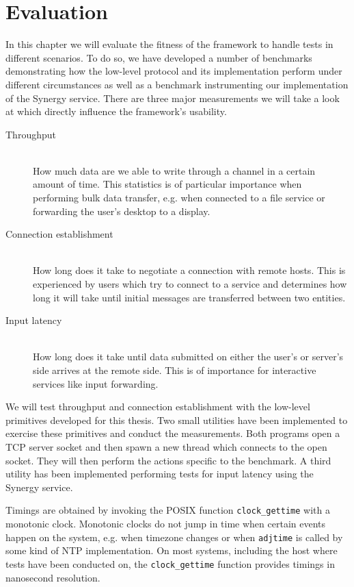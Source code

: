 \chapter{Evaluation}
\label{sec:evaluation}

In this chapter we will evaluate the fitness of the framework to handle tests in different scenarios.
To do so, we have developed a number of benchmarks demonstrating how the low-level protocol and its implementation perform under different circumstances as well as a benchmark instrumenting our implementation of the Synergy service.
There are three major measurements we will take a look at which directly influence the framework's usability.
\begin{description}
    \item[Throughput]\hfill\\
        How much data are we able to write through a channel in a certain amount of time.
        This statistics is of particular importance when performing bulk data transfer, e.g. when connected to a file service or forwarding the user's desktop to a display.
    \item[Connection establishment]\hfill\\
        How long does it take to negotiate a connection with remote hosts.
        This is experienced by users which try to connect to a service and determines how long it will take until initial messages are transferred between two entities.
    \item[Input latency]\hfill\\
        How long does it take until data submitted on either the user's or server's side arrives at the remote side.
        This is of importance for interactive services like input forwarding.
\end{description}

We will test throughput and connection establishment with the low-level primitives developed for this thesis.
Two small utilities have been implemented to exercise these primitives and conduct the measurements.
Both programs open a TCP server socket and then spawn a new thread which connects to the open socket.
They will then perform the actions specific to the benchmark.
A third utility has been implemented performing tests for input latency using the Synergy service.

Timings are obtained by invoking the POSIX function \lstinline{clock_gettime} with a monotonic clock.
Monotonic clocks do not jump in time when certain events happen on the system, e.g. when timezone changes or when \lstinline{adjtime} is called by some kind of NTP implementation.
On most systems, including the host where tests have been conducted on, the \lstinline{clock_gettime} function provides timings in nanosecond resolution.

